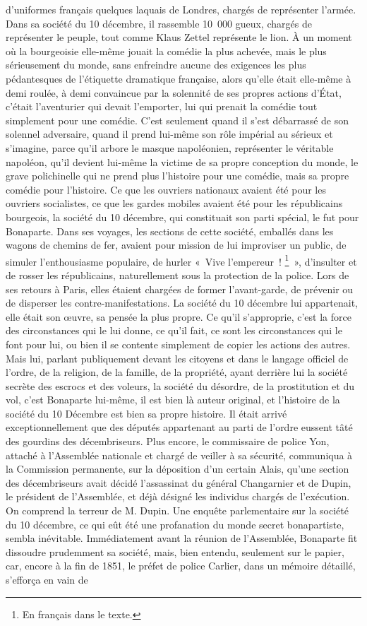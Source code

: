 \documentclass[french,twoside]{book} %
\begin{document}
d’uniformes français quelques laquais de Londres, chargés de représenter l’armée. Dans sa société du 10 décembre, il rassemble 10 000 gueux, chargés de représenter le peuple, tout comme Klaus Zettel représente le lion. À un moment où la bourgeoisie elle-même jouait la comédie la plus achevée, mais le plus sérieusement du monde, sans enfreindre aucune des exigences les plus pédantesques de l’étiquette dramatique française, alors qu’elle était elle-même à demi roulée, à demi convaincue par la solennité de ses propres actions d’État, c’était l’aventurier qui devait l’emporter, lui qui prenait la comédie tout simplement pour une comédie. C’est seulement quand il s’est débarrassé de son solennel adversaire, quand il prend lui-même son rôle impérial au sérieux et s’imagine, parce qu’il arbore le masque napoléonien, représenter le véritable napoléon, qu’il devient lui-même la victime de sa propre conception du monde, le grave polichinelle qui ne prend plus l’histoire pour une comédie, mais sa propre comédie pour l’histoire. Ce que les ouvriers nationaux avaient été pour les ouvriers socialistes, ce que les gardes mobiles avaient été pour les républicains bourgeois, la société du 10 décembre, qui constituait son parti spécial, le fut pour Bonaparte. Dans ses voyages, les sections de cette société, emballés dans les wagons de chemins de fer, avaient pour mission de lui improviser un public, de simuler l’enthousiasme populaire, de hurler « Vive l’empereur ! \footnote{En français dans le texte.} », d’insulter et de rosser les républicains, naturellement sous la protection de la police. Lors de ses retours à Paris, elles étaient chargées de former l’avant-garde, de prévenir ou de disperser les contre-manifestations. La société du 10 décembre lui appartenait, elle était son œuvre, sa pensée la plus propre. Ce qu’il s’approprie, c’est la force des circonstances qui le lui donne, ce qu’il fait, ce sont les circonstances qui le font pour lui, ou bien il se contente simplement de copier les actions des autres. Mais lui, parlant publiquement devant les citoyens et dans le langage officiel de l’ordre, de la religion, de la famille, de la propriété, ayant derrière lui la société secrète des escrocs et des voleurs, la société du désordre, de la prostitution et du vol, c’est Bonaparte lui-même, il est bien là auteur original, et l’histoire de la société du 10 Décembre est bien sa propre histoire. Il était arrivé exceptionnellement que des députés appartenant au parti de l’ordre eussent tâté des gourdins des décembriseurs. Plus encore, le commissaire de police Yon, attaché à l’Assemblée nationale et chargé de veiller à sa sécurité, communiqua à la Commission permanente, sur la déposition d’un certain Alais, qu’une section des décembriseurs avait décidé l’assassinat du général Changarnier et de Dupin, le président de l’Assemblée, et déjà désigné les individus chargés de l’exécution. On comprend la terreur de M. Dupin. Une enquête parlementaire sur la société du 10 décembre, ce qui eût été une profanation du monde secret bonapartiste, sembla inévitable. Immédiatement avant la réunion de l’Assemblée, Bonaparte fit dissoudre prudemment sa société, mais, bien entendu, seulement sur le papier, car, encore à la fin de 1851, le préfet de police Carlier, dans un mémoire détaillé, s’efforça en vain de 
\end{document}

